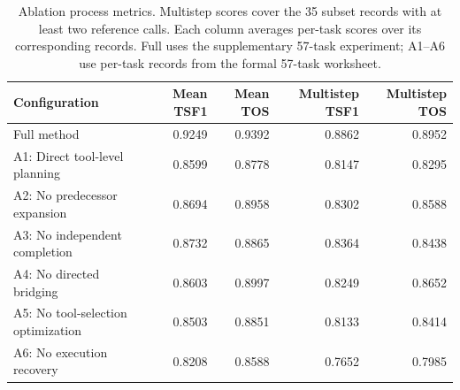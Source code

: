 \begin{table}[t]
\caption{Ablation process metrics. Multistep scores cover the 35 subset records with at least two reference calls. Each column averages per-task scores over its corresponding records. Full uses the supplementary 57-task experiment; A1--A6 use per-task records from the formal 57-task worksheet.}
\label{tab:ablation-process}
\centering
\begin{tabularx}{\textwidth}{@{}Xrrrr@{}}
\toprule
Configuration & Mean TSF1 & Mean TOS & Multistep TSF1 & Multistep TOS \\
\midrule
Full method & 0.9249 & 0.9392 & 0.8862 & 0.8952 \\
A1: Direct tool-level planning & 0.8599 & 0.8778 & 0.8147 & 0.8295 \\
A2: No predecessor expansion & 0.8694 & 0.8958 & 0.8302 & 0.8588 \\
A3: No independent completion & 0.8732 & 0.8865 & 0.8364 & 0.8438 \\
A4: No directed bridging & 0.8603 & 0.8997 & 0.8249 & 0.8652 \\
A5: No tool-selection optimization & 0.8503 & 0.8851 & 0.8133 & 0.8414 \\
A6: No execution recovery & 0.8208 & 0.8588 & 0.7652 & 0.7985 \\
\bottomrule
\end{tabularx}
\end{table}
